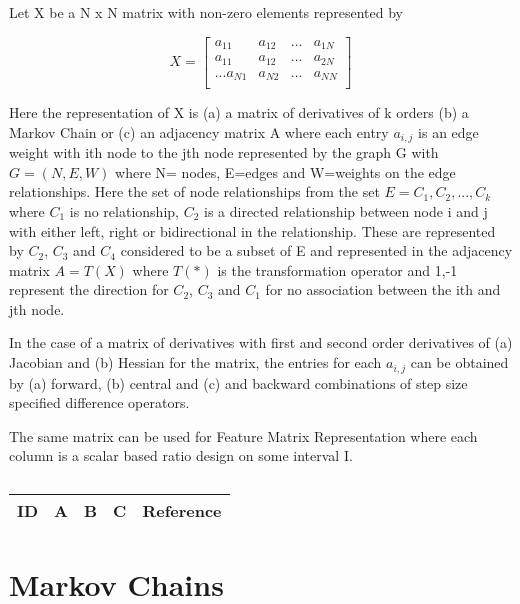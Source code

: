 Let X be a N x N matrix with non-zero elements represented by 

\begin{equation}
X=
\begin{bmatrix}
a_{11} & a_{12} & ... & a_{1N} \\
a_{11} & a_{12} & ... & a_{2N} \\
.
.
.
a_{N1} & a_{N2} & ... & a_{NN} \\
\end{bmatrix}
\end{equation}

Here the representation of X is (a) a matrix of derivatives of k orders (b) a Markov Chain or (c) an adjacency matrix A where each entry $a_{i,j}$ is an edge weight with ith node to the jth node represented by the graph G with $G=(N,E,W)$ where N= nodes, E=edges and W=weights on the edge relationships.  Here the set of node relationships from the set $E={C_{1}, C_{2},...,C_{k}}$ where $C_{1}$ is no relationship,  $C_{2}$ is a directed relationship between node i and j with either left, right or bidirectional in the relationship.  These are represented by $C_{2}$, $C_{3}$ and $C_{4}$ considered to be a subset of E and represented in the adjacency matrix $A=T(X)$ where $T(*)$ is the transformation operator and 1,-1 represent the direction for $C_{2}$, $C_{3}$ and $C_{1}$ for no association between the ith and jth node. 

In the case of a matrix of derivatives with first and second order derivatives of (a) Jacobian and (b) Hessian  for the matrix, the entries for each $a_{i,j}$ can be obtained by (a) forward, (b) central and (c) and backward combinations of step size specified difference operators. 

The same matrix can be used for Feature Matrix Representation where each column is a scalar based ratio design on some interval I.

\centering
\begin{table}[H]\footnotesize
	\caption{}
	\begin{tabular}{rp{1cm}p{2cm}p{3cm}p{1cm}}
		\hline
		ID & A & B & C & Reference \\
		\hline
		\hline
	\end{tabular}
\end{table}
\raggedright

\section{Markov Chains}

